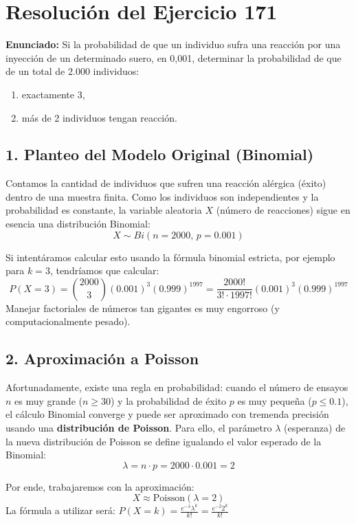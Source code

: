 \documentclass[11pt, a4paper]{article}
\begin{document}
\section*{Resolución del Ejercicio 171}

\textbf{Enunciado:} Si la probabilidad de que un individuo sufra una reacción por una inyección de un determinado suero, en 0,001, determinar la probabilidad de que de un total de 2.000 individuos:
\begin{enumerate}[label=\alph*)]
    \item exactamente 3,
    \item más de 2 individuos tengan reacción.
\end{enumerate}

\vspace{0.5cm}

\subsection*{1. Planteo del Modelo Original (Binomial)}

Contamos la cantidad de individuos que sufren una reacción alérgica (éxito) dentro de una muestra finita. Como los individuos son independientes y la probabilidad es constante, la variable aleatoria $X$ (número de reacciones) sigue en esencia una distribución Binomial:
\[ X \sim Bi(n = 2000, \, p = 0.001) \]

Si intentáramos calcular esto usando la fórmula binomial estricta, por ejemplo para $k=3$, tendríamos que calcular:
\[ P(X = 3) = \binom{2000}{3} (0.001)^3 (0.999)^{1997} = \frac{2000!}{3! \cdot 1997!} (0.001)^3 (0.999)^{1997} \]
Manejar factoriales de números tan gigantes es muy engorroso (y computacionalmente pesado). 

\subsection*{2. Aproximación a Poisson}

Afortunadamente, existe una regla en probabilidad: cuando el número de ensayos $n$ es muy grande ($n \ge 30$) y la probabilidad de éxito $p$ es muy pequeña ($p \le 0.1$), el cálculo Binomial converge y puede ser aproximado con tremenda precisión usando una \textbf{distribución de Poisson}.
Para ello, el parámetro $\lambda$ (esperanza) de la nueva distribución de Poisson se define igualando el valor esperado de la Binomial:
\[ \lambda = n \cdot p = 2000 \cdot 0.001 = 2 \]

Por ende, trabajaremos con la aproximación:
\[ X \approx \text{Poisson}(\lambda = 2) \]
La fórmula a utilizar será: $P(X = k) = \frac{e^{-\lambda} \lambda^k}{k!} = \frac{e^{-2} 2^k}{k!}$
\end{document}
